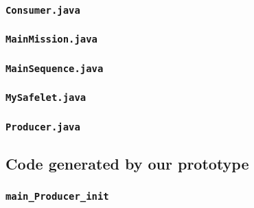 \begin{landscape}
\begin{multicols}{2}
\subsubsection{\texttt{Consumer.java}}


\subsubsection{\texttt{MainMission.java}}


\subsubsection{\texttt{MainSequence.java}}


\subsubsection{\texttt{MySafelet.java}}


\subsubsection{\texttt{Producer.java}}


\subsection{Code generated by our prototype}
\label{Buffer-code-our-subsection}

\subsubsection{\texttt{main\_Producer\_init}}


\end{multicols}
\end{landscape}
